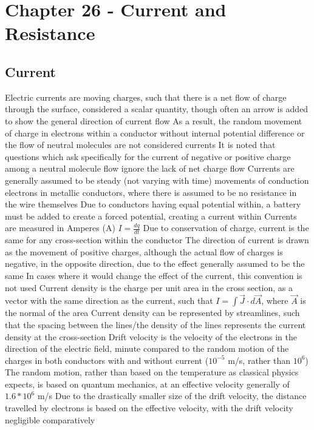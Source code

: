 \documentclass[11 pt, twoside]{article}
\newenvironment{outline*}
{
	\begin{outline}[enumerate]
	}
	{\end{outline}
}
\begin{document}
\section{Chapter 26 - Current and Resistance}
\subsection{Current}
\begin{outline*}
\1 Electric currents are moving charges, such that there is a net flow of charge through the surface, considered a scalar quantity, though often an arrow is added to show the general direction of current flow
\2 As a result, the random movement of charge in electrons within a conductor without internal potential difference or the flow of neutral molecules are not considered currents
\3 It is noted that questions which ask specifically for the current of negative or positive charge among a neutral molecule flow ignore the lack of net charge flow
\2 Currents are generally assumed to be steady (not varying with time) movements of conduction electrons in metallic conductors, where there is assumed to be no resistance in the wire themselves
\3 Due to conductors having equal potential within, a battery must be added to create a forced potential, creating a current within
\2 Currents are measured in Amperes (A)
\2 $I = \frac{dq}{dt}$
\1 Due to conservation of charge, current is the same for any cross-section within the conductor
\1 The direction of current is drawn as the movement of positive charges, although the actual flow of charges is negative, in the opposite direction, due to the effect generally assumed to be the same
\2 In cases where it would change the effect of the current, this convention is not used
\1 Current density is the charge per unit area in the cross section, as a vector with the same direction as the current, such that $I = \int \vec{J} \cdot d\vec{A}$, where $\vec{A}$ is the normal of the area
\2 Current density can be represented by streamlines, such that the spacing between the lines/the density of the lines represents the current density at the cross-section
\1 Drift velocity is the velocity of the electrons in the direction of the electric field, minute compared to the random motion of the charges in both conductors with and without current ($10^{-5}$ m/s, rather than $10^6$)
\2 The random motion, rather than based on the temperature as classical physics expects, is based on quantum mechanics, at an effective velocity generally of $1.6 * 10^6$ m/s
\3 Due to the drastically smaller size of the drift velocity, the distance travelled by electrons is based on the effective velocity, with the drift velocity negligible comparatively

\end{outline*}
\end{document}
